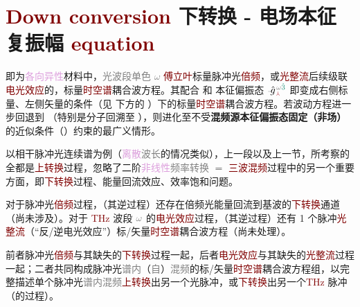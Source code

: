 \vspace*{-1.0em}

\section{\textcolor{Maroon}{Down conversion} 下转换 - 电场本征复振幅 \textcolor{Maroon}{equation}}\label{sec:down_convert}

 即为\textcolor{Plum}{各向异性}材料中，\textcolor{gray}{光波段单色 $\omega$} \textcolor{Maroon}{傅立叶}标量\textcolor{NavyBlue}{脉冲光}\textcolor{Maroon}{倍频}，或\textcolor{Maroon}{光整流}后续级联\textcolor{Maroon}{电光效应}的，标量\textcolor{Maroon}{时空谱}耦合波方程。其配合  和 \textcolor{PineGreen}{本征偏振态} $\xint{{}^{}_{\mathcolor{gray}{-}}}{10}{\hat{g}}^{\;\!\mathcolor{gray}{\omega} \textcolor{PineGreen}{\hat{3}}}_{\;\! \textcolor{Maroon}{\Yup}}$ 即变成右侧标量、左侧矢量的条件（见  下方的 ）下的标量\textcolor{Maroon}{时空谱}耦合波方程。若波动方程进一步回退到 （特别是分子回溯至 ），则进化至不受\textbf{\textcolor{NavyBlue}{混频源}\textcolor{PineGreen}{本征偏振态}固定（非场）}的近似条件（）约束的最广义情形。

以相干\textcolor{NavyBlue}{脉冲光连续谱}为例（\textcolor{Plum}{离散}\textcolor{gray}{波长}的情况类似），上一段以及上一节，所考察的全都是\textcolor{Maroon}{上转换}过程，忽略了二阶\textcolor{Plum}{非线性}\textcolor{gray}{频率转换} $=$ \textcolor{Maroon}{三波混频}过程中的另一个重要方面，即\textcolor{Maroon}{下转换}过程、\textcolor{NavyBlue}{能量回流}效应、\textcolor{NavyBlue}{效率饱和}问题。

对于\textcolor{NavyBlue}{脉冲光}\textcolor{Maroon}{倍频}过程，（其逆过程）还存在\textcolor{NavyBlue}{倍频光}能量回流到\textcolor{NavyBlue}{基波}的\textcolor{Maroon}{下转换}通道（尚未涉及）。对于 \textcolor{Maroon}{THz} 波段 $\textcolor{gray}{\omega}$ 的\textcolor{Maroon}{电光效应}过程，（其逆过程）还有 1 个\textcolor{NavyBlue}{脉冲}\textcolor{Maroon}{光整流}（“反/逆电光效应”）标/矢量\textcolor{Maroon}{时空谱}耦合波方程（尚未处理）。

前者\textcolor{NavyBlue}{脉冲光}\textcolor{Maroon}{倍频}与其缺失的\textcolor{Maroon}{下转换}过程一起，后者\textcolor{Maroon}{电光效应}与其缺失的\textcolor{Maroon}{光整流}过程一起；二者共同构成\textcolor{NavyBlue}{脉冲光}\textcolor{gray}{谱内}（\textcolor{gray}{自}）\textcolor{gray}{混频}的标/矢量\textcolor{Maroon}{时空谱}耦合波方程组，以完整描述单个\textcolor{NavyBlue}{脉冲光}\textcolor{gray}{谱内混频}\textcolor{Maroon}{上转换}出另一个\textcolor{NavyBlue}{光脉冲}，或\textcolor{Maroon}{下转换}出另一个\textcolor{Maroon}{THz} \textcolor{NavyBlue}{脉冲}（的过程）。

